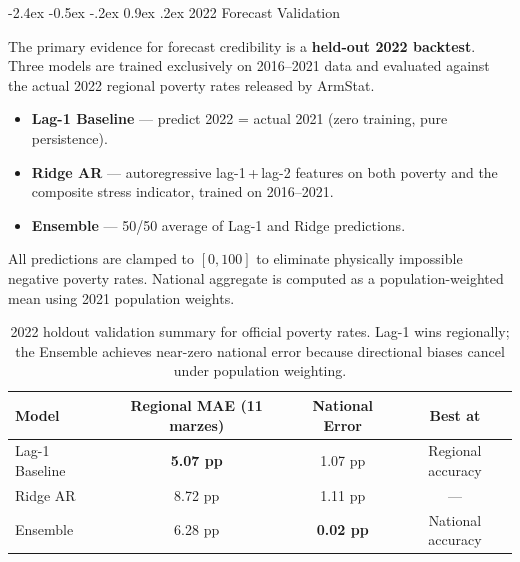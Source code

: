 \documentclass[12pt]{article}
\makeatletter
\renewcommand\subsection{%
  \@startsection{subsection}{2}{\z@}%
    {-2.4ex \@plus -0.5ex \@minus -.2ex}%
    {0.9ex \@plus .2ex}%
    {\color{steelblue}\normalsize\bfseries}}
\makeatother
\begin{document}
\subsection{2022 Forecast Validation}

\indent\hspace*{1em}
The primary evidence for forecast credibility is a \textbf{held-out 2022
backtest}. Three models are trained exclusively on 2016--2021 data and evaluated
against the actual 2022 regional poverty rates released by ArmStat.

\begin{itemize}[leftmargin=*, itemsep=0.2em]
  \item \textbf{Lag-1 Baseline} --- predict 2022 = actual 2021 (zero training,
        pure persistence).
  \item \textbf{Ridge AR} --- autoregressive lag-1\,+\,lag-2 features on both poverty and the composite stress indicator, trained on 2016--2021.
  \item \textbf{Ensemble} --- 50/50 average of Lag-1 and Ridge predictions.
\end{itemize}

\noindent All predictions are clamped to $[0, 100]$ to eliminate physically
impossible negative poverty rates. National aggregate is computed as a
population-weighted mean using 2021 population weights.

\begin{table}[H]
\centering
{}
\begin{tabularx}{\textwidth}{lCCC}
\toprule
{}
{\color{navyblue}\textbf{Model}} &
{\color{navyblue}\textbf{Regional MAE (11 marzes)}} &
{\color{navyblue}\textbf{National Error}} &
{\color{navyblue}\textbf{Best at}} \\
\midrule
Lag-1 Baseline & \textbf{5.07 pp} & 1.07 pp & Regional accuracy \\
Ridge AR       & 8.72 pp          & 1.11 pp & ---               \\
Ensemble       & 6.28 pp          & \textbf{0.02 pp} & National accuracy \\
\bottomrule
\end{tabularx}
\caption{2022 holdout validation summary for official poverty rates. Lag-1 wins regionally;
the Ensemble achieves near-zero national error because directional biases cancel
under population weighting.}
\end{table}
\end{document}
